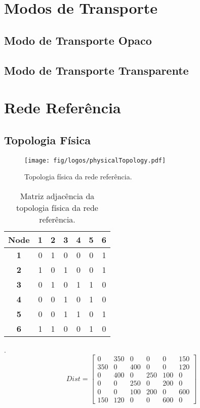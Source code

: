 \section{Modos de Transporte }
\label{modoTransporte}

\subsection{Modo de Transporte Opaco}
\label{modoTransporteOpaco}

\subsection{Modo de Transporte Transparente}
\label{modoTransporteTransparente}

\section{Rede Referência}
\label{referenceNetwork}

\subsection{Topologia Física}

\begin{figure}[H]
  \begin{center}
    \texttt{[image: fig/logos/physicalTopology.pdf]}
    \caption{Topologia física da rede referência.}
  \end{center}
   \label{referencePhysical}
\end{figure}

\begin{table}[H]
\centering
\begin{tabular}{|c|c|c|c|c|c|c|}
\hline
\textbf{Node} & \textbf{1} & \textbf{2} & \textbf{3} & \textbf{4} & \textbf{5} & \textbf{6} \\ \hline
\textbf{1} & 0 & 1 & 0 & 0 & 0 & 1 \\ \hline
\textbf{2} & 1 & 0 & 1 & 0 & 0 & 1 \\ \hline
\textbf{3} & 0 & 1 & 0 & 1 & 1 & 0 \\ \hline
\textbf{4} & 0 & 0 & 1 & 0 & 1 & 0 \\ \hline
\textbf{5} & 0 & 0 & 1 & 1 & 0 & 1 \\ \hline
\textbf{6} & 1 & 1 & 0 & 0 & 1 & 0 \\ \hline
\end{tabular}
\caption{Matriz adjacência da topologia física da rede referência.}
\label{referenceAdjacency}
\end{table}
.  
\[
Dist=
  \begin{bmatrix}
    0 & 350 & 0 & 0 & 0 & 150 \\
    350 & 0 & 400 & 0 & 0 & 120 \\
    0 & 400 & 0 & 250 & 100 & 0 \\
    0 & 0 & 250 & 0 & 200 & 0 \\
    0 & 0 & 100 & 200 & 0 & 600 \\
    150 & 120 & 0 & 0 & 600 & 0
  \end{bmatrix}
\]

